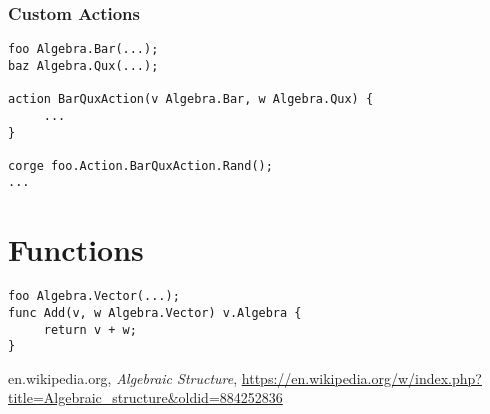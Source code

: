 \documentclass{amsbook}
\begin{document}
\subsection{Custom Actions}

\begin{verbatim}
foo Algebra.Bar(...);
baz Algebra.Qux(...);

action BarQuxAction(v Algebra.Bar, w Algebra.Qux) {
     ...
}

corge foo.Action.BarQuxAction.Rand();
...
\end{verbatim}

\chapter{Functions}

\begin{verbatim}
foo Algebra.Vector(...);
func Add(v, w Algebra.Vector) v.Algebra {
     return v + w;
}
\end{verbatim}


\begin{thebibliography}{9}

en.wikipedia.org,
\textit{Algebraic Structure},
\url{https://en.wikipedia.org/w/index.php?title=Algebraic_structure&oldid=884252836}
  
\end{thebibliography}
\end{document}
